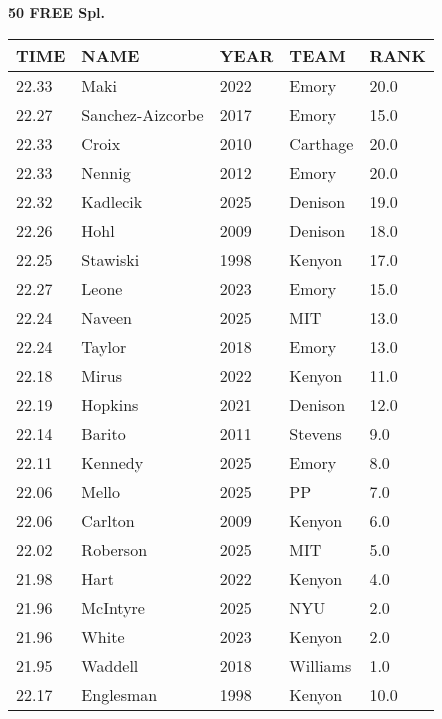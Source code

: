 \begin{center}
\begin{minipage}[t]{0.7\textwidth}
\centering
\textbf{50 FREE Spl.}\\[0.05cm]
\begin{tabular}{@{}p{1.8cm}p{2.8cm}p{1.2cm}p{1.4cm}p{0.8cm}@{}}
\hline
\textbf{TIME} & \textbf{NAME} & \textbf{YEAR} & \textbf{TEAM} & \textbf{RANK} \\
\hline
22.33 & Maki & 2022 & Emory & 20.0 \\
22.27 & Sanchez-Aizcorbe & 2017 & Emory & 15.0 \\
22.33 & Croix & 2010 & Carthage & 20.0 \\
22.33 & Nennig & 2012 & Emory & 20.0 \\
22.32 & Kadlecik & 2025 & Denison & 19.0 \\
22.26 & Hohl & 2009 & Denison & 18.0 \\
22.25 & Stawiski & 1998 & Kenyon & 17.0 \\
22.27 & Leone & 2023 & Emory & 15.0 \\
22.24 & Naveen & 2025 & MIT & 13.0 \\
22.24 & Taylor & 2018 & Emory & 13.0 \\
22.18 & Mirus & 2022 & Kenyon & 11.0 \\
22.19 & Hopkins & 2021 & Denison & 12.0 \\
22.14 & Barito & 2011 & Stevens & 9.0 \\
22.11 & Kennedy & 2025 & Emory & 8.0 \\
22.06 & Mello & 2025 & PP & 7.0 \\
22.06 & Carlton & 2009 & Kenyon & 6.0 \\
22.02 & Roberson & 2025 & MIT & 5.0 \\
21.98 & Hart & 2022 & Kenyon & 4.0 \\
21.96 & McIntyre & 2025 & NYU & 2.0 \\
21.96 & White & 2023 & Kenyon & 2.0 \\
21.95 & Waddell & 2018 & Williams & 1.0 \\
22.17 & Englesman & 1998 & Kenyon & 10.0 \\
\hline
\end{tabular}
\end{minipage}
\end{center}

\vspace{0.4cm}

